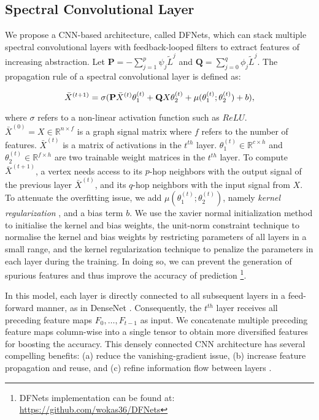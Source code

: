 \documentclass{article}
\begin{document}
\subsection{Spectral Convolutional Layer} 


We propose a CNN-based architecture, called DFNets, which can stack multiple spectral convolutional layers with feedback-looped filters to extract features of increasing abstraction. Let $\mathbf{P}=-\sum_{j=1}^{p}\psi_j\tilde{L}^j$ and $\mathbf{Q}=\sum_{j=0}^{q} \phi_j \tilde{L}^j$. The propagation rule of a spectral convolutional layer is defined as:

\begin{equation}\label{equ:spectral-layer}
\bar{X}^{(t+1)}= \sigma(\bold{P}\bar{X}^{(t)}\theta_1^{(t)} + \bold{Q}X\theta_2^{(t)} + \mu (\theta_1^{(t)};\theta_2^{(t)}) + b),
\end{equation}

\noindent where $\sigma$ refers to a non-linear activation function such as $ReLU$. $\bar{X} ^{(0)}=X \in \mathbb{R}^{n\times f}$ is a graph signal matrix where $f$ refers to the number of features. $\bar{X}^{(t)}$ is a matrix of activations in the $t^{th}$ layer. $\theta_1^{(t)} \in \mathbb{R}^{c\times h}$ and $\theta_2^{(t)} \in \mathbb{R}^{f\times h}$ are two trainable weight matrices in the $t^{th}$ layer. To compute $\bar{X}^{(t+1)}$, a vertex needs access to its $p$-hop neighbors with the output signal of the previous layer $\bar{X}^{(t)}$, and its $q$-hop neighbors with the input signal from $X$. To attenuate the overfitting issue, we add $\mu (\theta_1^{(t)};\theta_2^{(t)})$, namely \emph{kernel regularization} \cite{cortes20092}, and a bias term $b$. We use the xavier normal initialization method \cite{glorot2010understanding} to initialise the kernel and bias weights, the unit-norm constraint technique \cite{douglas2000gradient} to normalise the kernel and bias weights by restricting parameters of all layers in a small range, and the kernel regularization technique to penalize the parameters in each layer during the training.  In doing so, we can prevent the generation of spurious features and thus improve the accuracy of prediction 
\footnote{DFNets implementation can be found at: \href{https://github.com/wokas36/DFNets} {https://github.com/wokas36/DFNets}}.

In this model, each layer is directly connected to all subsequent layers in a feed-forward manner, as in DenseNet \cite{huang2017densely}. Consequently, the $t^{th}$ layer receives all preceding feature maps $F_0, \dots, F_{t-1}$ as input. We concatenate multiple preceding feature maps column-wise into a single tensor to obtain more diversified features for boosting the accuracy. This densely connected CNN architecture has several compelling benefits: (a) reduce the vanishing-gradient issue, (b) increase feature propagation and reuse, and (c) refine information flow between layers  \cite{huang2017densely}. 
\end{document}
